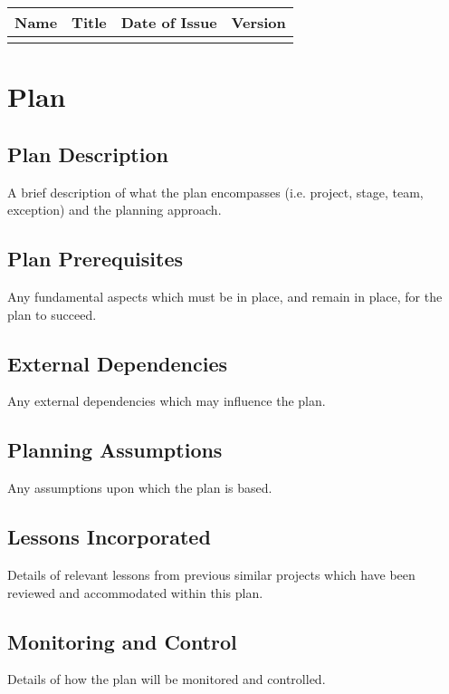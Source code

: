 \documentclass{report}
\begin{document}
\begin{center}
    \begin{tabular}{| p{2cm} | l | p{2cm} | p{2cm} |}
    \hline
    Name & Title & Date of Issue & Version \\
    \hline
     & & & \\
    \hline
    \end{tabular}
\end{center}

\tableofcontents

\chapter{Plan}

\section{Plan Description}
A brief description of what the plan encompasses (i.e. project, stage, team, exception) and the planning approach.

\section{Plan Prerequisites}
Any fundamental aspects which must be in place, and remain in place, for the plan to succeed.

\section{External Dependencies}
Any external dependencies which may influence the plan.

\section{Planning Assumptions}
Any assumptions upon which the plan is based.

\section{Lessons Incorporated}
Details of relevant lessons from previous similar projects which have been reviewed and accommodated within this plan.

\section{Monitoring and Control}
Details of how the plan will be monitored and controlled.
\end{document}
